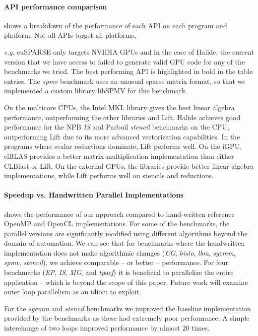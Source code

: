 \paragraph*{API performance comparison}
 shows a breakdown of the performance of each API on each program and platform.
Not all APIs
target all platforms, {\emph{e.g.} cuSPARSE only targets NVIDIA GPUs and in the
case of Halide, the current version that we have access to failed to generate
valid GPU code for any of the benchmarks we tried.
The best performing API is highlighted in bold in the table entries.
The \emph{spmv} benchmark uses an unusual sparse matrix format, so that we
implemented a custom library libSPMV for this benchmark.

On the multicore CPUs, the Intel MKL library gives the best linear algebra performance, outperforming the other libraries and Lift.
Halide achieves good performance for the NPB \emph{IS} and Parboil \emph{stencil} benchmarks on the CPU, outperforming Lift due to its more advanced vectorization capabilities.
In the programs where scalar reductions dominate, Lift performs well.
On the iGPU, clBLAS provides a better matrix-multiplication implementation than either CLBlast or Lift.
On the external GPUs, the libraries provide better linear algebra implementations, while Lift performs well on stencils and reductions.

\paragraph*{Speedup vs. Handwritten Parallel Implementations}
 shows the performance of our approach compared to hand-written reference OpenMP and OpenCL implementations.
For some of the benchmarks, the parallel versions are significantly modified using different algorithms beyond the domain of automation.
We can see that for benchmarks where the handwritten implementation does not make algorithmic changes (\emph{CG}, \emph{histo}, \emph{lbm}, \emph{sgemm}, \emph{spmv}, \emph{stencil}), we achieve comparable -- or better -- performance.
For four benchmarks (\emph{EP}, \emph{IS}, \emph{MG}, and \emph{tpacf}) it is beneficial to parallelize the entire application -- which is beyond the scope of this paper. Future work will examine outer loop parallelism as an idiom to exploit.

For the \emph{sgemm} and \emph{stencil} benchmarks we improved the baseline implementation provided by the benchmarks as these had extremely poor performance.
A simple interchange of two loops improved performance by almost 20 times.

}
